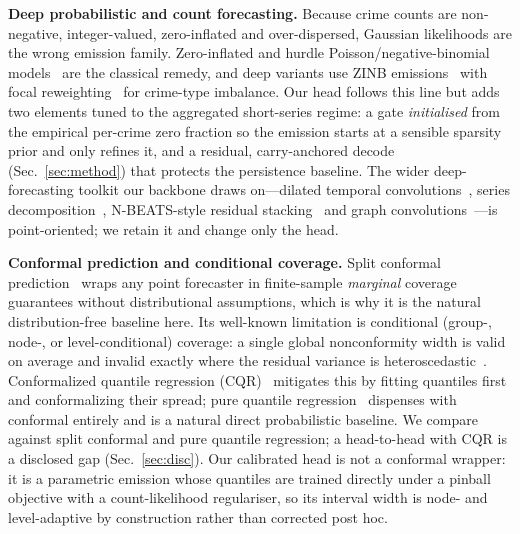 \documentclass[11pt,conference]{IEEEtran}
\begin{document}
\textbf{Deep probabilistic and count forecasting.} Because crime counts are
non-negative, integer-valued, zero-inflated and over-dispersed, Gaussian
likelihoods are the wrong emission family. Zero-inflated and hurdle
Poisson/negative-binomial models~\cite{lambert1992poisson,hilbe2011negativebinomial}
are the classical remedy, and deep variants use ZINB
emissions~\cite{yang2021zinb} with focal reweighting~\cite{lin2017focal} for
crime-type imbalance. Our head follows this line but adds two elements tuned to
the aggregated short-series regime: a gate \emph{initialised} from the empirical
per-crime zero fraction so the emission starts at a sensible sparsity prior and
only refines it, and a residual, carry-anchored decode (Sec.~\ref{sec:method})
that protects the persistence baseline. The wider deep-forecasting toolkit our
backbone draws on---dilated temporal convolutions~\cite{bai2018tcn},
series decomposition~\cite{zeng2023dlinear}, N-BEATS-style residual
stacking~\cite{oreshkin2020nbeats} and graph convolutions~\cite{kipf2017gcn}---is
point-oriented; we retain it and change only the head.

\textbf{Conformal prediction and conditional coverage.} Split conformal
prediction~\cite{vovk2005random,shafer2008tutorial,lei2018distribution} wraps any
point forecaster in finite-sample \emph{marginal} coverage guarantees without
distributional assumptions, which is why it is the natural distribution-free
baseline here. Its well-known limitation is conditional (group-, node-, or
level-conditional) coverage: a single global nonconformity width is valid on
average and invalid exactly where the residual variance is
heteroscedastic~\cite{romano2019cqr,angelopoulos2022gentle,gneiting2007calibration}.
Conformalized quantile regression (CQR)~\cite{romano2019cqr} mitigates this by
fitting quantiles first and conformalizing their spread; pure quantile
regression~\cite{koenker1978regression} dispenses with conformal entirely and is
a natural direct probabilistic baseline. We compare against split conformal and
pure quantile regression; a head-to-head with CQR is a disclosed gap
(Sec.~\ref{sec:disc}). Our calibrated head is not a conformal wrapper: it is a
parametric emission whose quantiles are trained directly under a pinball
objective with a count-likelihood regulariser, so its interval width is node-
and level-adaptive by construction rather than corrected post hoc.
\end{document}
